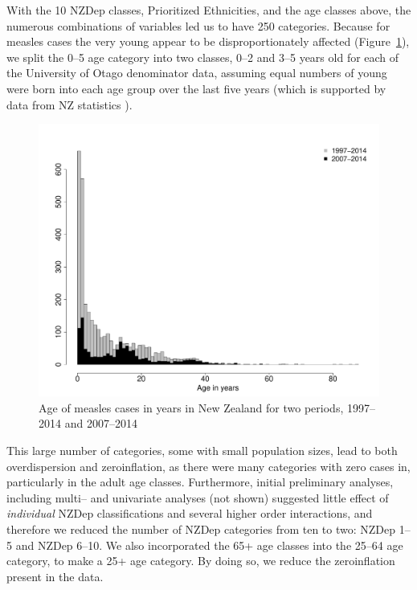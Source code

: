 \documentclass{article}
\begin{document}
\begin{itemize}
With the 10 NZDep classes, Prioritized Ethnicities, and the age classes above, the numerous combinations of variables led us to have 250 categories. Because for measles cases the very young appear to be disproportionately affected (Figure~\ref{fig:ageinyears}), we split the 0--5 age category into two classes, 0--2 and 3--5 years old for each of the University of Otago denominator data, assuming equal numbers of young were born into each age group over the last five years (which is supported by data from NZ statistics \citep{stats14}).


\begin{figure}
\begin{center}
\includegraphics{draftfinalreport-002}
\end{center}
\caption{Age of measles cases in years in New Zealand for two periods, 1997--2014 and 2007--2014}
\label{fig:ageinyears}
\end{figure}





This large number of categories, some with small population sizes, lead to both overdispersion and zeroinflation, as there were many categories with zero cases in, particularly in the adult age classes. Furthermore, initial preliminary analyses, including multi-- and univariate analyses (not shown) suggested little effect of \textit{individual} NZDep classifications and several higher order interactions, and therefore we reduced the number of NZDep categories from ten to two: NZDep 1--5 and NZDep 6--10. We also incorporated the 65+ age classes into the 25--64 age category, to make a 25+ age category. By doing so, we reduce the zeroinflation present in the data. 


\end{itemize}
\end{document}
